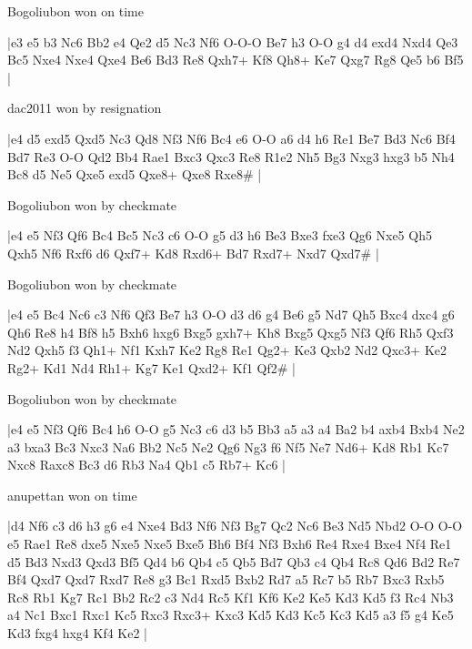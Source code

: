 \showboard

Bogoliubon won on time

\makegametitle
|e3 e5 b3 Nc6 Bb2 e4 Qe2 d5 Nc3 Nf6 O-O-O Be7 h3 O-O g4 d4 exd4 Nxd4 Qe3 Bc5 Nxe4 Nxe4 Qxe4 Be6 Bd3 Re8 Qxh7+ Kf8 Qh8+ Ke7 Qxg7 Rg8 Qe5 b6 Bf5  |

\showboard

dac2011 won by resignation

\makegametitle
|e4 d5 exd5 Qxd5 Nc3 Qd8 Nf3 Nf6 Bc4 e6 O-O a6 d4 h6 Re1 Be7 Bd3 Nc6 Bf4 Bd7 Re3 O-O Qd2 Bb4 Rae1 Bxc3 Qxc3 Re8 R1e2 Nh5 Bg3 Nxg3 hxg3 b5 Nh4 Bc8 d5 Ne5 Qxe5 exd5 Qxe8+ Qxe8 Rxe8\#  |

\showboard

Bogoliubon won by checkmate

\makegametitle
|e4 e5 Nf3 Qf6 Bc4 Bc5 Nc3 c6 O-O g5 d3 h6 Be3 Bxe3 fxe3 Qg6 Nxe5 Qh5 Qxh5 Nf6 Rxf6 d6 Qxf7+ Kd8 Rxd6+ Bd7 Rxd7+ Nxd7 Qxd7\#  |

\showboard

Bogoliubon won by checkmate

\makegametitle
|e4 e5 Bc4 Nc6 c3 Nf6 Qf3 Be7 h3 O-O d3 d6 g4 Be6 g5 Nd7 Qh5 Bxc4 dxc4 g6 Qh6 Re8 h4 Bf8 h5 Bxh6 hxg6 Bxg5 gxh7+ Kh8 Bxg5 Qxg5 Nf3 Qf6 Rh5 Qxf3 Nd2 Qxh5 f3 Qh1+ Nf1 Kxh7 Ke2 Rg8 Re1 Qg2+ Ke3 Qxb2 Nd2 Qxc3+ Ke2 Rg2+ Kd1 Nd4 Rh1+ Kg7 Ke1 Qxd2+ Kf1 Qf2\#  |

\showboard

Bogoliubon won by checkmate

\makegametitle
|e4 e5 Nf3 Qf6 Bc4 h6 O-O g5 Nc3 c6 d3 b5 Bb3 a5 a3 a4 Ba2 b4 axb4 Bxb4 Ne2 a3 bxa3 Bc3 Nxc3 Na6 Bb2 Nc5 Ne2 Qg6 Ng3 f6 Nf5 Ne7 Nd6+ Kd8 Rb1 Kc7 Nxc8 Raxc8 Bc3 d6 Rb3 Na4 Qb1 c5 Rb7+ Kc6  |

\showboard

anupettan won on time

\makegametitle
|d4 Nf6 c3 d6 h3 g6 e4 Nxe4 Bd3 Nf6 Nf3 Bg7 Qc2 Nc6 Be3 Nd5 Nbd2 O-O O-O e5 Rae1 Re8 dxe5 Nxe5 Nxe5 Bxe5 Bh6 Bf4 Nf3 Bxh6 Re4 Rxe4 Bxe4 Nf4 Re1 d5 Bd3 Nxd3 Qxd3 Bf5 Qd4 b6 Qb4 c5 Qb5 Bd7 Qb3 c4 Qb4 Rc8 Qd6 Bd2 Re7 Bf4 Qxd7 Qxd7 Rxd7 Re8 g3 Bc1 Rxd5 Bxb2 Rd7 a5 Rc7 b5 Rb7 Bxc3 Rxb5 Rc8 Rb1 Kg7 Rc1 Bb2 Rc2 c3 Nd4 Rc5 Kf1 Kf6 Ke2 Ke5 Kd3 Kd5 f3 Rc4 Nb3 a4 Nc1 Bxc1 Rxc1 Kc5 Rxc3 Rxc3+ Kxc3 Kd5 Kd3 Kc5 Kc3 Kd5 a3 f5 g4 Ke5 Kd3 fxg4 hxg4 Kf4 Ke2  |


